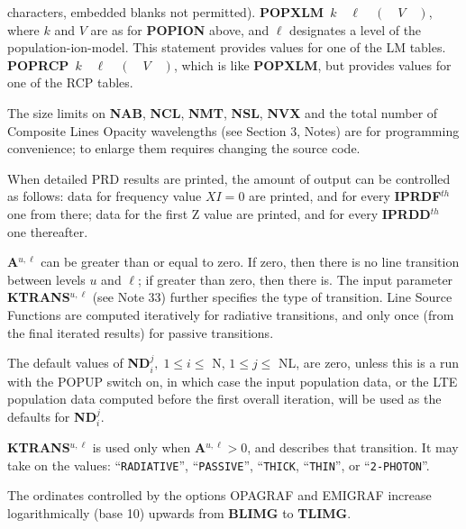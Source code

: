 characters, embedded blanks not permitted). \np
{\bf POPXLM} $\, k \quad \ell \quad ( \quad V \quad )$, \np
where $k$ and $V$ are as for {\bf POPION} above, and $\ell$ designates a
level of the \break population-ion-model. This statement provides
values for one of the LM tables. \np
{\bf POPRCP} $\, k \quad \ell \quad ( \quad V \quad )$, \np
which is like {\bf POPXLM}, but provides values for one of the
RCP tables.
\blankline
\blankline
\centerline{}
\space \noindent
The size limits on {\bf NAB}, {\bf NCL}, {\bf NMT}, {\bf NSL},
{\bf NVX} and the total number of Composite Lines Opacity wavelengths
(see Section 3, Notes) are for programming convenience; 
to enlarge them requires changing the source code.
\blankline
\blankline
\centerline{}
\space \noindent
When detailed PRD results are printed, the amount of output can be controlled
as follows: data for frequency value $XI = 0$ are printed, and for every
{\bf IPRDF}$^{th}$ one from there; data for the first Z value are printed,
and for every {\bf IPRDD}$^{th}$ one thereafter.
\ej
\centerline{}
\space \noindent
{\bf A}$^{u,\ell}$ can be greater than or equal to zero. If zero, then there
is no line transition between levels $u$ and $\ell$; if greater than zero,
then there is. The input parameter {\bf KTRANS}$^{u, \ell}$ (see Note 33)
further specifies the type of transition.
Line Source Functions are computed iteratively for radiative transitions,
and only once (from the final iterated results) for passive transitions.
\blankline
\blankline
\centerline{}
\space \noindent
The default values of
{\bf ND}$^j_i, \; 1 \leq i \leq$ N, $1 \leq j \leq$ NL, are zero, unless this
is a run with the POPUP switch on, in which case the input population data,
or the LTE population data computed before the first overall iteration, will
be used as the defaults for {\bf ND}$^j_i$.
\blankline
\blankline
\centerline{}
\space \noindent
{\bf KTRANS}$^{u,\ell}$ is used only when {\bf A}$^{u,\ell} > 0$, and describes
that transition. It may take on the values: ``{\tt RADIATIVE}'', 
``{\tt PASSIVE}'', ``{\tt THICK}, ``{\tt THIN}'', or ``{\tt 2-PHOTON}''.
\blankline
\blankline
\centerline{}
\space \noindent
The ordinates controlled by the options OPAGRAF and EMIGRAF increase 
logarithmically (base 10) upwards from {\bf BLIMG} to {\bf TLIMG}.
